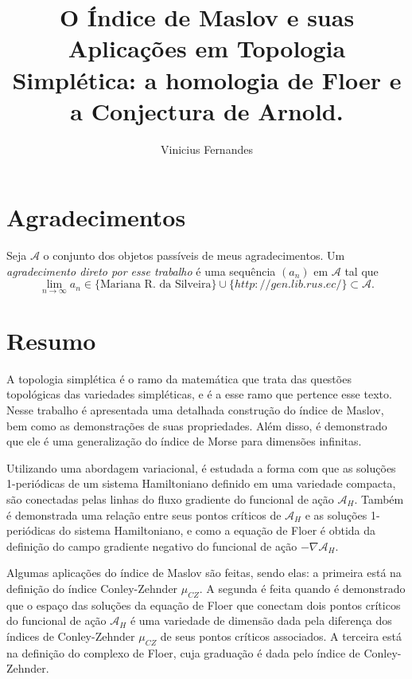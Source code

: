 \documentclass[12pt]{book}
\newcommand{\funcionalH}{\mathcal{A}_{H}}
\newcommand{\gradientefuncional}{\nabla \funcionalH}
\newcommand{\iconleyabrev}{\mu_{CZ}}
\begin{document}
	
	\title{O Índice de Maslov e suas Aplicações em Topologia Simplética: a homologia de Floer e a Conjectura de Arnold.}
	
	\author{Vinicius Fernandes}
	
	\maketitle
	
	\tableofcontents
	\chapter*{Agradecimentos}
	Seja $\mathcal{A}$ o conjunto dos objetos passíveis de meus agradecimentos. Um \textit{agradecimento direto por esse trabalho} é uma sequência $(a_{n})$ em $\mathcal{A}$ tal que
	$$
	\lim\limits_{n\to \infty} a_{n} \in \{\text{Mariana R. da Silveira}\} \cup \{http://gen.lib.rus.ec/ \} \subset \mathcal{A}.
	$$
	
	
	\chapter*{Resumo}
	A topologia simplética é o ramo da matemática que trata das questões topológicas das variedades simpléticas, e é a esse ramo que pertence esse texto. Nesse trabalho é apresentada uma detalhada construção do índice de Maslov, bem como as demonstrações de suas propriedades. Além disso, é demonstrado que ele é uma generalização do índice de Morse para dimensões infinitas.
	
	Utilizando uma abordagem variacional, é estudada a forma com que as soluções 1-periódicas de um sistema Hamiltoniano definido em uma variedade compacta, são conectadas pelas linhas do fluxo gradiente do funcional de ação $\funcionalH$. Também é demonstrada uma relação entre seus pontos críticos de $\funcionalH$ e as soluções 1-periódicas do sistema Hamiltoniano, e como a equação de Floer é obtida da definição do campo gradiente negativo do funcional de ação $-\gradientefuncional$.
	
	Algumas aplicações do índice de Maslov são feitas, sendo elas: a primeira está na definição do índice Conley-Zehnder $\iconleyabrev$. A segunda é feita quando é demonstrado que o espaço das soluções da equação de Floer que conectam dois pontos críticos do funcional de ação $\funcionalH$ é uma variedade de dimensão dada pela diferença dos índices de Conley-Zehnder $\iconleyabrev$ de seus pontos críticos associados. A terceira está na definição do complexo de Floer, cuja graduação é dada pelo índice de Conley-Zehnder. 
	
\end{document}
